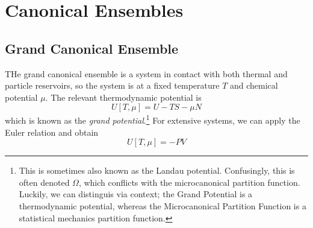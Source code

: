 \chapter{Canonical Ensembles}
\section{Grand Canonical Ensemble}
THe grand canonical ensemble is a system in contact with both thermal and particle reservoirs, so the system is at a fixed temperature \(T\) and chemical potential \(\mu\). The relevant thermodynamic potential is
\begin{equation}
	U[T,\mu] = U-TS-\mu N
\end{equation}
which is known as the \emph{grand potential}.\footnote{This is sometimes also known as the Landau potential. Confusingly, this is often denoted \(\Omega\), which conflicts with the microcanonical partition function. Luckily, we can distinguis via context; the Grand Potential is a thermodynamic potential, whereas the Microcanonical Partition Function is a statistical mechanics partition function.} For extensive systems, we can apply the Euler relation and obtain
\[U[T,\mu] = -PV\]
